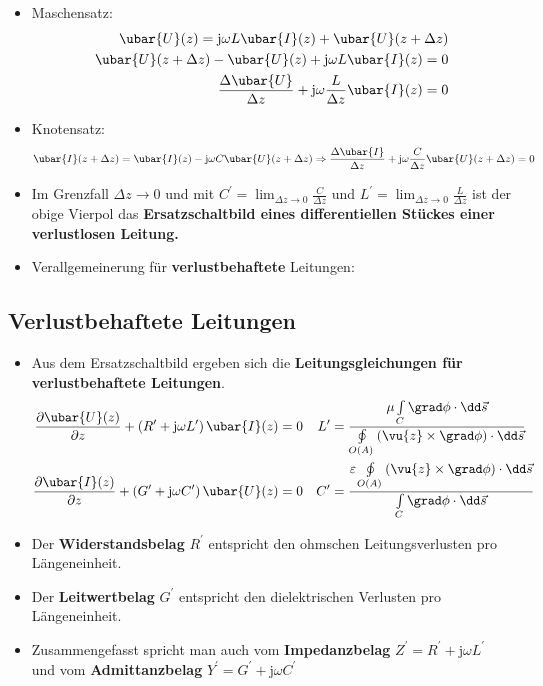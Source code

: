 \begin{itemize}
	\item Maschensatz:
	\begin{equation}\begin{split}
			\ubar{U}(z) = \mathrm{j}\omega L  \ubar{I}(z) +  \ubar{U}(z+\Delta z)\\
			\ubar{U}(z+\Delta z) - \ubar{U}(z) + \mathrm{j}\omega L  \ubar{I}(z) =0  \\
			\frac{\Delta  \ubar{U}}{\Delta z} + \mathrm{j}\omega \frac{L}{\Delta z}  \ubar{I}(z) =0
	\end{split}\end{equation}
	
	\item Knotensatz:
	\begin{equation}
		\ubar{I}(z+\Delta z) =  \ubar{I}(z) - \mathrm{j}\omega C  \ubar{U}(z+\Delta z) \Rightarrow \frac{\Delta  \ubar{I}}{\Delta z} + \mathrm{j}\omega \frac{C}{\Delta z}  \ubar{U}(z+\Delta z) = 0
	\end{equation}
	\item Im Grenzfall \(\Delta z \to 0\) und mit \(C^\prime=\lim_{\Delta z \to 0} \frac{C}{\Delta z}\) und \(L^\prime=\lim_{\Delta z \to 0} \frac{L}{\Delta z}\) ist der obige Vierpol das \textbf{Ersatzschaltbild eines differentiellen Stückes einer verlustlosen Leitung.}
	\item Verallgemeinerung für \textbf{verlustbehaftete} Leitungen:
	\begin{center}
		
	\end{center}
	
\end{itemize}
\subsection{Verlustbehaftete Leitungen}
\begin{itemize}
	\item Aus dem Ersatzschaltbild ergeben sich die \textbf{Leitungsgleichungen für verlustbehaftete Leitungen}.
	\begin{align}
		\frac{\partial  \ubar{U}(z)}{\partial z} + \left(R^\prime + \mathrm{j}\omega L^\prime\right)  \ubar{I}(z) & = 0 & L^\prime & =\frac{\mu\int\limits_C\grad \phi \cdot \dd \vec{s}}{\oint\limits_{O(A)} \left(\vu{z}\times\grad \phi\right) \cdot \dd\vec{s}}         \\
		\frac{\partial  \ubar{I}(z)}{\partial z} +\left(G^\prime + \mathrm{j}\omega C^\prime\right)  \ubar{U}(z)  & = 0 & C^\prime & = \frac{\varepsilon\oint\limits_{O(A)}\left(\vu{z}\times \grad \phi\right) \cdot \dd \vec{s}}{\int\limits_C \grad \phi\cdot\dd\vec{s}}
	\end{align}
	\item Der \textbf{Widerstandsbelag} \(R^\prime\) entspricht den ohmschen Leitungsverlusten pro Längeneinheit.
	\item Der \textbf{Leitwertbelag} \(G^\prime\)  entspricht den dielektrischen Verlusten pro Längeneinheit.
	\item Zusammengefasst spricht man auch vom \textbf{Impedanzbelag} \(Z^\prime = R^\prime + \mathrm{j}\omega L^\prime\) und vom \textbf{Admittanzbelag} \(Y^\prime = G^\prime + \mathrm{j}\omega C^\prime\)
\end{itemize}
